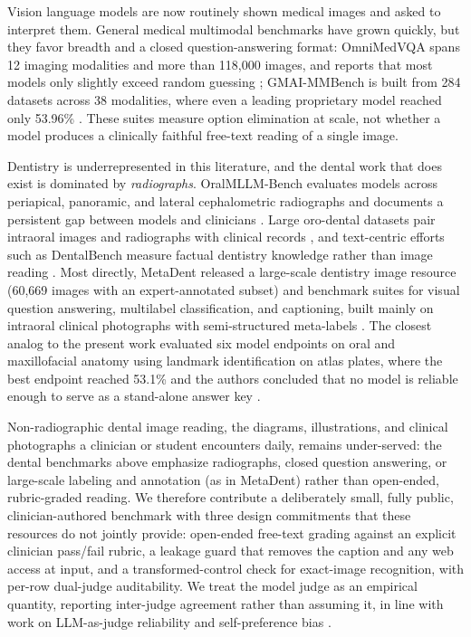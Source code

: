 \documentclass[11pt]{article}
\begin{document}
Vision language models are now routinely shown medical images and asked to interpret them. General medical multimodal benchmarks have grown quickly, but they favor breadth and a closed question-answering format: OmniMedVQA spans 12 imaging modalities and more than 118{,}000 images, and reports that most models only slightly exceed random guessing \cite{hu2024omnimedvqa}; GMAI-MMBench is built from 284 datasets across 38 modalities, where even a leading proprietary model reached only 53.96\% \cite{chen2024gmaimmbench}. These suites measure option elimination at scale, not whether a model produces a clinically faithful free-text reading of a single image.

Dentistry is underrepresented in this literature, and the dental work that does exist is dominated by \emph{radiographs}. OralMLLM-Bench evaluates models across periapical, panoramic, and lateral cephalometric radiographs and documents a persistent gap between models and clinicians \cite{wang2026oralmllm}. Large oro-dental datasets pair intraoral images and radiographs with clinical records \cite{lv2026orodental}, and text-centric efforts such as DentalBench measure factual dentistry knowledge rather than image reading \cite{zhu2025dentalbench}. Most directly, MetaDent released a large-scale dentistry image resource (60{,}669 images with an expert-annotated subset) and benchmark suites for visual question answering, multilabel classification, and captioning, built mainly on intraoral clinical photographs with semi-structured meta-labels \cite{li2026metadent}. The closest analog to the present work evaluated six model endpoints on oral and maxillofacial anatomy using landmark identification on atlas plates, where the best endpoint reached 53.1\% and the authors concluded that no model is reliable enough to serve as a stand-alone answer key \cite{nguyen2025omf}.

Non-radiographic dental image reading, the diagrams, illustrations, and clinical photographs a clinician or student encounters daily, remains under-served: the dental benchmarks above emphasize radiographs, closed question answering, or large-scale labeling and annotation (as in MetaDent) rather than open-ended, rubric-graded reading. We therefore contribute a deliberately small, fully public, clinician-authored benchmark with three design commitments that these resources do not jointly provide: open-ended free-text grading against an explicit clinician pass/fail rubric, a leakage guard that removes the caption and any web access at input, and a transformed-control check for exact-image recognition, with per-row dual-judge auditability. We treat the model judge as an empirical quantity, reporting inter-judge agreement rather than assuming it, in line with work on LLM-as-judge reliability \cite{zheng2023judge,arora2025healthbench} and self-preference bias \cite{panickssery2024selfrecognition,wataoka2024selfpreference}.
\end{document}
